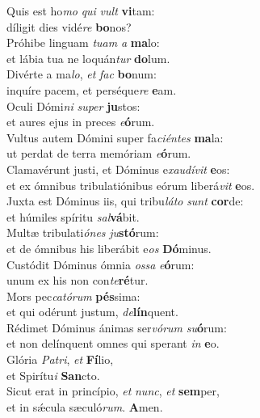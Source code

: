\evenverse Quis est ho\textit{mo} \textit{qui} \textit{vult} \textbf{vi}tam:~\*\\
\evenverse díligit dies vidé\textit{re} \textbf{bo}nos?\\
\oddverse Próhibe linguam \textit{tu}\textit{am} \textit{a} \textbf{ma}lo:~\*\\
\oddverse et lábia tua ne loquán\textit{tur} \textbf{do}lum.\\
\evenverse Divérte a ma\textit{lo}, \textit{et} \textit{fac} \textbf{bo}num:~\*\\
\evenverse inquíre pacem, et perséque\textit{re} \textbf{e}am.\\
\oddverse Oculi Dómi\textit{ni} \textit{su}\textit{per} \textbf{ju}stos:~\*\\
\oddverse et aures ejus in preces \textit{e}\textbf{ó}rum.\\
\evenverse Vultus autem Dómini super fa\textit{ci}\textit{én}\textit{tes} \textbf{ma}la:~\*\\
\evenverse ut perdat de terra memóriam \textit{e}\textbf{ó}rum.\\
\oddverse Clamavérunt justi, et Dóminus e\textit{xau}\textit{dí}\textit{vit} \textbf{e}os:~\*\\
\oddverse et ex ómnibus tribulatiónibus eórum liberá\textit{vit} \textbf{e}os.\\
\evenverse Juxta est Dóminus iis, qui tribu\textit{lá}\textit{to} \textit{sunt} \textbf{cor}de:~\*\\
\evenverse et húmiles spíritu \textit{sal}\textbf{vá}bit.\\
\oddverse Multæ tribulati\textit{ó}\textit{nes} \textit{ju}\textbf{stó}rum:~\*\\
\oddverse et de ómnibus his liberábit e\textit{os} \textbf{Dó}minus.\\
\evenverse Custódit Dóminus ómnia \textit{os}\textit{sa} \textit{e}\textbf{ó}rum:~\*\\
\evenverse unum ex his non con\textit{te}\textbf{ré}tur.\\
\oddverse Mors pec\textit{ca}\textit{tó}\textit{rum} \textbf{pés}sima:~\*\\
\oddverse et qui odérunt justum, \textit{de}\textbf{lín}quent.\\
\evenverse Rédimet Dóminus ánimas ser\textit{vó}\textit{rum} \textit{su}\textbf{ó}rum:~\*\\
\evenverse et non delínquent omnes qui sperant \textit{in} \textbf{e}o.\\
\oddverse Glória \textit{Pa}\textit{tri}, \textit{et} \textbf{Fí}lio,~\*\\
\oddverse et Spirítu\textit{i} \textbf{San}cto.\\
\evenverse Sicut erat in princípio, \textit{et} \textit{nunc}, \textit{et} \textbf{sem}per,~\*\\
\evenverse et in sǽcula sæculó\textit{rum}. \textbf{A}men.\\
